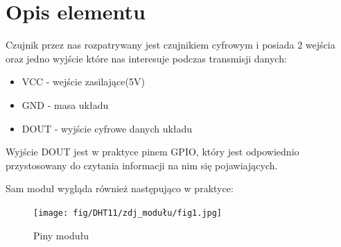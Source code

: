 \documentclass[11pt, a4paper]{article}
\institute{Instytut Robotyki i Inteligencji Maszynowej}
\begin{document}
\newpage

\section*{Opis elementu} 
Czujnik przez nas rozpatrywany jest czujnikiem cyfrowym i posiada 2 wejścia oraz jedno wyjście które nas interesuje podczas transmisji danych:
\begin{itemize}
    \item VCC - wejście zasilające(5V)
    \item GND - masa układu
    \item DOUT - wyjście cyfrowe danych układu
\end{itemize}
Wyjście DOUT jest w praktyce pinem GPIO, który jest odpowiednio przystosowany do czytania informacji na nim się pojawiających.

Sam moduł wygląda również następująco w praktyce:
\begin{figure}[H]
    \centering
    \texttt{[image: fig/DHT11/zdj\_modułu/fig1.jpg]}
    \caption{Piny modułu}
    \label{fig:fig1}
\end{figure}
\end{document}
